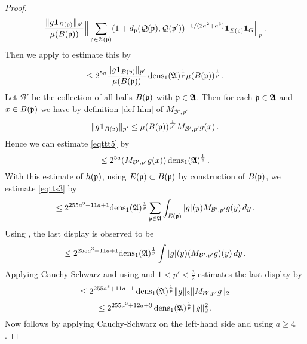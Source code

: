 \begin{proof}
\begin{equation}
    \frac{\|g\mathbf{1}_{B({\mathfrak p})}\|_{p'}}{\mu(B({\mathfrak p}))}
    \Big\|\sum_{{\mathfrak p}\in\mathfrak{A}({\mathfrak p})}(1+d_{{\mathfrak p}}({\mathcal{Q}}({\mathfrak p}), {\mathcal{Q}}({\mathfrak p}'))^{-1/(2a^2+a^3)}\mathbf{1}_{E({\mathfrak p})}\mathbf{1}_G\Big\|_{p}\, .
\end{equation}
Then we apply  to estimate this by
\begin{equation}\label{eqttt5}
    \le 2^{5a}
    \frac{\|g\mathbf{1}_{B({\mathfrak p})}\|_{p'}}{\mu(B({\mathfrak p}))}
    \operatorname{\operatorname{dens}}_1(\mathfrak{A})^{\frac 1p}\mu(B({\mathfrak p}))^{\frac 1p}\,.
\end{equation}
Let $\mathcal{B}'$ be the collection of all balls
$B({\mathfrak p})$ with ${\mathfrak p}\in \mathfrak{A}$. Then
for each ${\mathfrak p}\in \mathfrak{A}$ and $x\in B({\mathfrak p})$ we have by
definition \eqref{def-hlm} of $M_{\mathcal{B}',p'}$
\begin{equation}
    \|g\mathbf{1}_{B({\mathfrak p})}\|_{p'}\le
    \mu(B({\mathfrak p}))^{\frac 1{p'}} M_{\mathcal{B}',p'}g(x) \, .
\end{equation}
Hence we can estimate \eqref{eqttt5} by
\begin{equation}
\label{eqttt5b}
    \le
    2^{5a}
    (M_{\mathcal{B}', p'}g(x))
   \operatorname{\operatorname{dens}}_1(\mathfrak{A})^{\frac 1p}\, .
\end{equation}
With this estimate of $h({\mathfrak p})$, using $E({\mathfrak p})\subset B({\mathfrak p})$ by construction of $B({\mathfrak p})$, we estimate \eqref{eqtts3} by
 \begin{equation}\label{eqtts4}
 \le 2^{255a^3+11a + 1} { \operatorname{\operatorname{dens}}_1(\mathfrak{A})^{\frac 1p}}\sum_{{\mathfrak p}\in \mathfrak{A}}
 \int_{E({\mathfrak p})}|g|(y)M_{\mathcal{B}', p'}g(y) \, dy\,.
         \end{equation}
Using , the last display is observed to be
\begin{equation}\label{eqtts4a}
\le 2^{255a^3+11a + 1}
 {\operatorname{\operatorname{dens}}_1(\mathfrak{A})^{\frac 1p}} \int |g|(y)(M_{\mathcal{B}', p'}g)(y) \, dy\,.
         \end{equation}
Applying Cauchy-Schwarz and using  and $1<p'<\frac 32$ estimates the last display by
\begin{equation}
    \le 2^{255a^3+11a + 1} \operatorname{\operatorname{dens}}_1(\mathfrak{A})^{\frac 1p}
    \|g\|_2 \|M_{\mathcal{B}', p'} g\|_2
\end{equation}
\begin{equation}
    \le 2^{255a^3+12a+3} \operatorname{\operatorname{dens}}_1(\mathfrak{A})^{\frac 1p}\|g\|_2 ^2\,.
\end{equation}
Now  follows by applying Cauchy-Schwarz on the left-hand side and using $a\ge 4$.
\end{proof}
